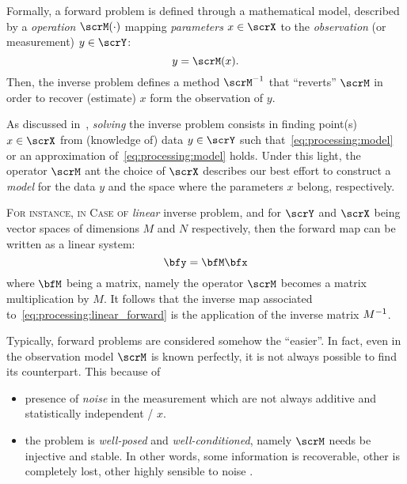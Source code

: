 Formally, a forward problem is defined through a mathematical model, described by a \textit{operation} $\scrM(\cdot)$
mapping \textit{parameters} $x \in \scrX$ to the \textit{observation} (or measurement) $y \in \scrY$:
\begin{equation}\label{eq:processing:model}
    y = \scrM(x)
    .
\end{equation}
Then, the inverse problem defines a method $\kinv{\scrM}$ that ``reverts'' $\scrM$ in order to recover (estimate) $x$ form the observation of $y$.

As discussed in~\cite{bal2012introduction}, \textit{solving} the inverse problem consists in finding point(s) $x \in \scrX$ from (knowledge of) data $y \in \scrY$
such that~\cref{eq:processing:model} or an approximation of~\cref{eq:processing:model} holds.
Under this light, the operator $\scrM$ ant the choice of $\scrX$ describes our best effort to construct a \textit{model} for the data $y$ and
the space where the parameters $x$ belong, respectively.

\textsc{For instance, in Case of} \textit{linear} inverse problem, and for $\scrY$ and $\scrX$ being vector spaces of dimensions $M$ and $N$ respectively,
then the forward map can be written as a linear system:
\begin{equation}\label{eq:processing:linear_forward}
    \bfy = \bfM \bfx
\end{equation}
where $\bfM$ being a matrix, namely the operator $\scrM$ becomes a matrix multiplication by $M$.
It follows that the inverse map associated to~\cref{eq:processing:linear_forward} is the application of the inverse matrix ${M}^{-1}$.

Typically, forward problems are considered somehow the ``easier''.
In fact, even in the observation model $\scrM$ is known perfectly, it is not always possible to find its counterpart.
This because of
\begin{itemize}
    \item presence of \textit{noise} in the measurement which are not always additive and statistically independent \wrt/ $x$.
    \item the problem is \textit{well-posed} and \textit{well-conditioned}, namely $\scrM$ needs be injective and stable.
    In other words, some information is recoverable, other is completely lost, other highly sensible to noise
    .
\end{itemize}

